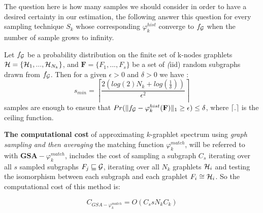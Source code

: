 The question here is how many samples we should consider in order to have a desired certainty in our estimation, the following answer this question for every sampling technique $S_k$ whose corresponding $\varphi_k^{hist}$ converge to $f_{\mathcal{G}}$ when the number of sample grows to infinity.
\begin{theorem}
Let $f_{\mathcal{G}}$ be a probability distribution on the finite set of k-nodes graphlets  $\mathcal{H}=\{\mathcal{H}_1,...,\mathcal{H}_{N_k}\}$, and $\mathbf{F}=\{F_1,...,F_{s}\}$ be a set of \emph(iid) random subgraphs drawn from $f_{\mathcal{G}}$. Then for a given $\epsilon>0$ and $\delta >0$ we have \citep{graphlet_kernel}:
\begin{equation}
s_{min}=\left \lceil \frac{2(log(2)N_k+log(\frac{1}{\delta} ))}{\epsilon^2} \right \rceil
\end{equation}
samples are enough to ensure that $Pr(\| f_{\mathcal{G}}-\varphi_k^{hist}(\mathbf{F}) \|_1 \geq \epsilon )\leq\delta$, where $\lceil.\rceil$ is the ceiling function.
\end{theorem}

\textbf{The computational cost} of approximating $k$-graphlet spectrum using \emph{ graph sampling and then averaging} the matching function $\varphi_k^{match}$, will be referred to with $\mathbf{GSA}-{\varphi_k^{match}}$, includes the cost of sampling a subgraph $C_s$ iterating over all $s$ sampled subgraphs $F_j\sqsubseteq \mathcal{G}$, iterating over all $N_k$ graphlets $\mathcal{H}_i$ and testing the isomorphism between each subgraph and each graphlet $F_i\cong \mathcal{H}_i$. So the computational cost of this method is:

\begin{equation}
\label{eq:cost_graphlet}
    C_{GSA-{\varphi_k^{match}}}= O(C_s s N_k C_k)
\end{equation}



